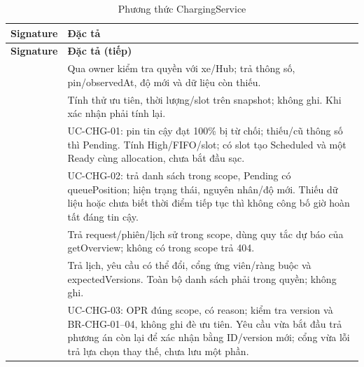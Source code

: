 \begin{longtable}{|L{58mm}|L{81mm}|}
\caption{Phương thức ChargingService}\\\hline
\textbf{Signature} & \textbf{Đặc tả}\\\hline
\endfirsthead
\hline\textbf{Signature} & \textbf{Đặc tả (tiếp)}\\\hline\endhead
{} & Qua owner kiểm tra quyền với xe/Hub; trả thông số, pin/observedAt, độ mới và dữ liệu còn thiếu.\\\hline
{} & Tính thử ưu tiên, thời lượng/slot trên snapshot; không ghi. Khi xác nhận phải tính lại.\\\hline
{} & UC-CHG-01: pin tin cậy đạt 100\% bị từ chối; thiếu/cũ thông số thì Pending. Tính High/FIFO/slot; có slot tạo Scheduled và một Ready cùng allocation, chưa bắt đầu sạc.\\\hline
{} & UC-CHG-02: trả danh sách trong scope, Pending có queuePosition; hiện trạng thái, nguyên nhân/độ mới. Thiếu dữ liệu hoặc chưa biết thời điểm tiếp tục thì không công bố giờ hoàn tất đáng tin cậy.\\\hline
{} & Trả request/phiên/lịch sử trong scope, dùng quy tắc dự báo của getOverview; không có trong scope trả 404.\\\hline
{} & Trả lịch, yêu cầu có thể đổi, cổng ứng viên/ràng buộc và expectedVersions. Toàn bộ danh sách phải trong quyền; không ghi.\\\hline
{} & UC-CHG-03: OPR đúng scope, có reason; kiểm tra version và BR-CHG-01--04, không ghi đè ưu tiên. Yêu cầu vừa bắt đầu trả phương án còn lại để xác nhận bằng ID/version mới; cổng vừa lỗi trả lựa chọn thay thế, chưa lưu một phần.\\\hline

\end{longtable}
